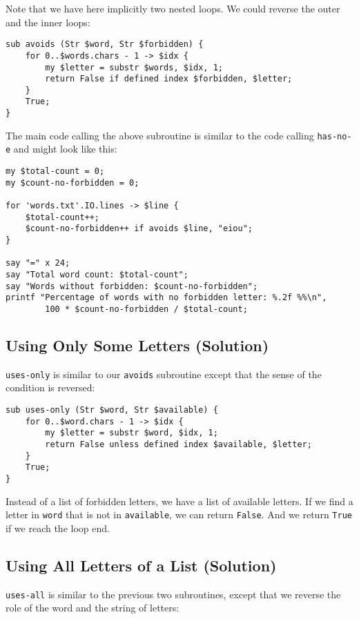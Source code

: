 Note that we have here implicitly two nested loops. We could 
reverse the outer and the inner loops:

\begin{verbatim}
sub avoids (Str $word, Str $forbidden) {
    for 0..$words.chars - 1 -> $idx {
        my $letter = substr $words, $idx, 1;
        return False if defined index $forbidden, $letter;
    }
    True;
}
\end{verbatim}
%

The main code calling the above subroutine is similar to 
the code calling {\tt has-no-e} and might look like 
this:

\begin{verbatim}
my $total-count = 0;
my $count-no-forbidden = 0;

for 'words.txt'.IO.lines -> $line { 
    $total-count++;
    $count-no-forbidden++ if avoids $line, "eiou";
}

say "=" x 24;
say "Total word count: $total-count";
say "Words without forbidden: $count-no-forbidden";
printf "Percentage of words with no forbidden letter: %.2f %%\n", 
        100 * $count-no-forbidden / $total-count;
\end{verbatim}    
%
  

\subsection{Using Only Some Letters (Solution)}

\verb"uses-only" is similar to our {\tt avoids} subroutine 
except that the sense of the condition is reversed:

\begin{verbatim}
sub uses-only (Str $word, Str $available) {
    for 0..$word.chars - 1 -> $idx {
        my $letter = substr $word, $idx, 1;
        return False unless defined index $available, $letter;
    }
    True;
}
\end{verbatim}
%
Instead of a list of forbidden letters, we have a list 
of available letters.  If we find a letter in {\tt word} that 
is not in {\tt available}, we can return {\tt False}. And 
we return {\tt True} if we reach the loop end.

\subsection{Using All Letters of a List (Solution)}

\verb"uses-all" is similar to the previous two subroutines, 
except that we reverse the role of the word and the string 
of letters:


